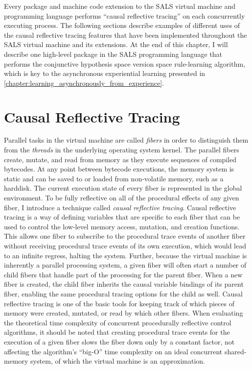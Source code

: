Every package and machine code extension to the SALS virtual machine
and programming language performs ``causal reflective tracing'' on
each concurrently executing process.  The following sections describe
examples of different uses of the causal reflective tracing features
that have been implemented throughout the SALS virtual machine and its
extensions.  At the end of this chapter, I will describe one
high-level package in the SALS programming language that performs the
conjunctive hypothesis space version space rule-learning algorithm,
which is key to the asynchronous experiential learning presented in
{\mbox{\autoref{chapter:learning_asynchronously_from_experience}}}.

\section{Causal Reflective Tracing}

Parallel tasks in the virtual machine are called {\emph{fibers}} in
order to distinguish them from the {\emph{threads}} in the underlying
operating system kernel.  The parallel fibers create, mutate, and read
from memory as they execute sequences of compiled bytecodes.  At any
point between bytecode executions, the memory system is static and can
be saved to or loaded from non-volatile memory, such as a harddisk.
The current execution state of every fiber is represented in the
global environment.  To be fully reflective on all of the procedural
effects of any given fiber, I introduce a technique called
{\emph{causal reflective tracing}}.  Causal reflective tracing is a
way of defining variables that are specific to each fiber that can be
used to control the low-level memory access, mutation, and creation
functions.  This allows one fiber to subscribe to the procedural trace
events of another fiber without receiving procedural trace events of
its own execution, which would lead to an infinite regress, halting
the system.  Further, because the virtual machine is inherently a
parallel processing system, a given fiber will often start a number of
child fibers that handle part of the processing for the parent fiber.
When a new fiber is created, the child fiber inherits the causal
variable bindings of its parent fiber, enabling the same procedural
tracing options for the child as well.  Causal reflective tracing is
one of the basic tools for keeping track of which pieces of memory
were created, mutated, or read by which other fibers.  When evaluating
the theoretical time complexity of concurrent procedurally reflective
control algorithms, it should be noted that creating procedural trace
events for the execution of a given fiber slows the fiber down only by
a constant factor, not affecting the algorithm's ``big-O'' time
complexity on an ideal concurrent shared-memory system, of which the
virtual machine is an approximation.

